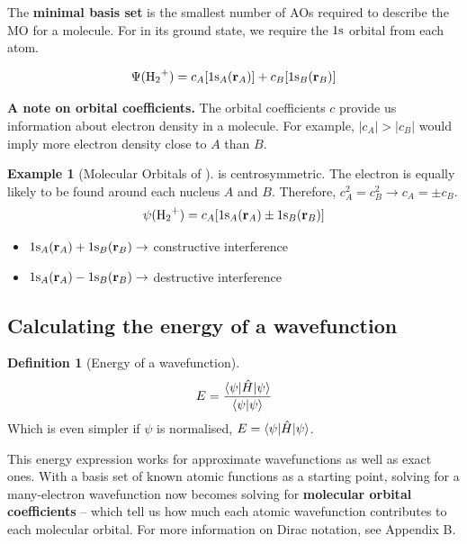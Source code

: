 \documentclass[a4paper]{tufte-handout}
\theoremstyle{definition}
\newtheorem{definition}{Definition}
\newtheorem{example}{Example}
\begin{document}
The \textbf{minimal basis set} is the smallest number of AOs required to describe the MO for a molecule. For 
in its ground state, we require the $1\ce{s}$ orbital from each  atom.

\begin{equation}
  \Psi(\ce{H2+}) = c_A [1\ce{s_}_A (\mathbf{r}_A)]+ c_B [1\ce{s_}_B (\mathbf{r}_B)]
\end{equation}

\textbf{A note on orbital coefficients.} The orbital coefficients $c$ provide us information
about electron density in a molecule. For example, $|c_A| > |c_B|$ would imply more electron density close
to $A$ than $B$.

\begin{example}[Molecular Orbitals of ]
   is centrosymmetric. The electron is equally likely to be found around each nucleus $A$ and $B$. 
  Therefore, $c_A^2 = c_B^2 \rightarrow c_A = \pm c_B$.
  \begin{equation}
    \psi(\ce{H2+}) = c_A[1\ce{s_}_A (\mathbf{r}_A) \pm 1\ce{s_}_B (\mathbf{r}_B)]
  \end{equation}

\begin{itemize}
  \item $1\ce{s_}_A (\mathbf{r}_A) + 1\ce{s_}_B (\mathbf{r}_B) \rightarrow$ constructive interference
  \item $1\ce{s_}_A (\mathbf{r}_A) - 1\ce{s_}_B (\mathbf{r}_B) \rightarrow$ destructive interference
\end{itemize}

\end{example}

\subsection{Calculating the energy of a wavefunction}

\begin{definition}[Energy of a wavefunction]
\begin{equation}
  E = \frac{\braket{\psi{|\hat{H}|\psi}}}{\braket{\psi|\psi}}
\end{equation}
Which is even simpler if $\psi$ is normalised, $E = \braket{\psi{|\hat{H}|\psi}}$.
\end{definition}

This energy expression works for approximate wavefunctions as well as exact ones. With a
basis set of known atomic functions as a starting point, solving for a many-electron wavefunction
now becomes 
solving for \textbf{molecular orbital coefficients} -- which tell us how much each atomic
wavefunction contributes to each molecular orbital.
For more information on Dirac notation, see Appendix B.
\end{document}
